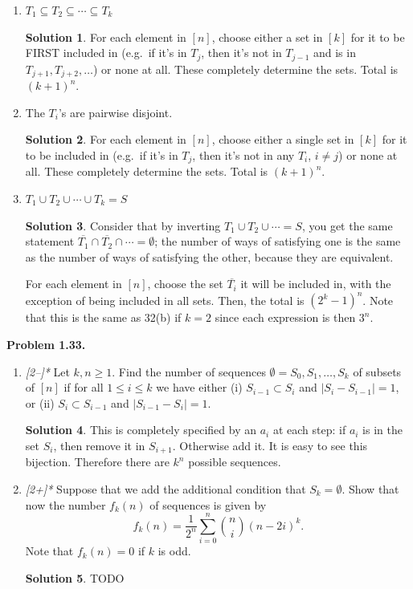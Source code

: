 \documentclass[11pt]{article}
\theoremstyle{definition}
\newtheorem*{solution}{Solution}
\newcounter{probnum}
\newcommand{\problem}[1]{%
  \setcounter{probnum}{#1}%
  \medskip
  \noindent\textbf{Problem 1.#1.}\quad
}
\begin{document}
\begin{enumerate}[label=(\alph*)]
  \item $T_1 \subseteq T_2 \subseteq \cdots \subseteq T_k$
    \begin{solution}
    For each element in $[n]$, choose either a set in $[k]$ for it to be FIRST
    included in (e.g.\ if it's in $T_j$, then it's not in $T_{j-1}$ and is in
    $T_{j+1}, T_{j+2}, \ldots$) or none at all. These completely determine the sets.
    Total is $(k+1)^n$.
    \end{solution}

  \item The $T_i$'s are pairwise disjoint.
    \begin{solution}
    For each element in $[n]$, choose either a single set in $[k]$ for it to be
    included in (e.g.\ if it's in $T_j$, then it's not in any $T_i$, $i \neq j$) or
    none at all. These completely determine the sets. Total is $(k+1)^n$.
    \end{solution}

  \item $T_1 \cup T_2 \cup \cdots \cup T_k = S$
    \begin{solution}
    Consider that by inverting $T_1 \cup T_2 \cup \cdots = S$, you get the same
    statement $\overline{T_1} \cap \overline{T_2} \cap \cdots = \emptyset$; the
    number of ways of satisfying one is the same as the number of ways of satisfying
    the other, because they are equivalent.

    For each element in $[n]$, choose the set $\overline{T_i}$ it will be included
    in, with the exception of being included in all sets. Then, the total is
    $(2^k - 1)^n$. Note that this is the same as 32(b) if $k = 2$ since each
    expression is then $3^n$.
    \end{solution}
\end{enumerate}

\problem{33}
\begin{enumerate}[label=(\alph*)]
  \item \textit{[2--]*} Let $k, n \geq 1$. Find the number of sequences
    $\emptyset = S_0, S_1, \ldots, S_k$ of subsets of $[n]$ if for all
    $1 \leq i \leq k$ we have either (i) $S_{i-1} \subset S_i$ and
    $|S_i - S_{i-1}| = 1$, or (ii) $S_i \subset S_{i-1}$ and $|S_{i-1} - S_i| = 1$.
    \begin{solution}
    This is completely specified by an $a_i$ at each step: if $a_i$ is in the set
    $S_i$, then remove it in $S_{i+1}$. Otherwise add it. It is easy to see this
    bijection. Therefore there are $k^n$ possible sequences.
    \end{solution}

  \item \textit{[2+]*} Suppose that we add the additional condition that $S_k =
    \emptyset$. Show that now the number $f_k(n)$ of sequences is given by
    \[
      f_k(n) = \frac{1}{2^n}\sum_{i=0}^{n}\binom{n}{i}(n-2i)^k.
    \]
    Note that $f_k(n) = 0$ if $k$ is odd.
    \begin{solution}
    TODO
    \end{solution}
\end{enumerate}
\end{document}
